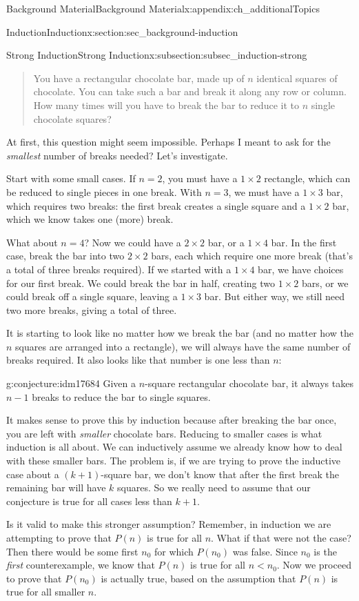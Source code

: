 \documentclass[oneside,10pt,]{book}
\numberwithin{equation}{chapter}
\newcommand{\lt}{<}
\begin{document}
\begin{appendixptx}{Background Material}{}{Background Material}{}{}{x:appendix:ch_additionalTopics}
\begin{sectionptx}{Induction}{}{Induction}{}{}{x:section:sec_background-induction}
\begin{subsectionptx}{Strong Induction}{}{Strong Induction}{}{}{x:subsection:subsec_induction-strong}
\begin{quote}%
You have a rectangular chocolate bar, made up of \(n\) identical squares of chocolate.  You can take such a bar and break it along any row or column.  How many times will you have to break the bar to reduce it to \(n\) single chocolate squares?%
\end{quote}
At first, this question might seem impossible.  Perhaps I meant to ask for the \emph{smallest} number of breaks needed?  Let's investigate.%
\par
Start with some small cases.  If \(n=2\), you must have a \(1\times 2\) rectangle, which can be reduced to single pieces in one break.  With \(n=3\), we must have a \(1\times 3\) bar, which requires two breaks: the first break creates a single square and a \(1\times 2\) bar, which we know takes one (more) break.%
\par
What about \(n=4\)?  Now we could have a \(2\times 2\) bar, or a \(1 \times 4\) bar.  In the first case, break the bar into two \(2\times 2\) bars, each which require one more break (that's a total of three breaks required).  If we started with a \(1 \times 4\) bar, we have choices for our first break.  We could break the bar in half, creating two \(1\times 2\) bars, or we could break off a single square, leaving a \(1\times 3\) bar.  But either way, we still need two more breaks, giving a total of three.%
\par
It is starting to look like no matter how we break the bar (and no matter how the \(n\) squares are arranged into a rectangle), we will always have the same number of breaks required.  It also looks like that number is one less than \(n\):%
\begin{conjecture}{}{}{g:conjecture:idm17684}%
Given a \(n\)-square rectangular chocolate bar, it always takes \(n-1\) breaks to reduce the bar to single squares.%
\end{conjecture}
It makes sense to prove this by induction because after breaking the bar once, you are left with \emph{smaller} chocolate bars.  Reducing to smaller cases is what induction is all about.  We can inductively assume we already know how to deal with these smaller bars.  The problem is, if we are trying to prove the inductive case about a \((k+1)\)-square bar, we don't know that after the first break the remaining bar will have \(k\) squares.  So we really need to assume that our conjecture is true for all cases less than \(k+1\).%
\par
Is it valid to make this stronger assumption?  Remember, in induction we are attempting to prove that \(P(n)\) is true for all \(n\).  What if that were not the case?  Then there would be some first \(n_0\) for which \(P(n_0)\) was false.  Since \(n_0\) is the \emph{first} counterexample, we know that \(P(n)\) is true for all \(n \lt n_0\).  Now we proceed to prove that \(P(n_0)\) is actually true, based on the assumption that \(P(n)\) is true for all smaller \(n\).%

\end{subsectionptx}
\end{sectionptx}
\end{appendixptx}
\end{document}
